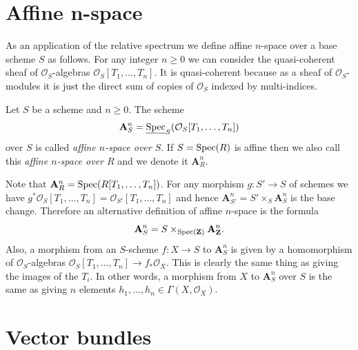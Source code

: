 \section{Affine n-space}
\label{section-affine-n-space}

\noindent
As an application of the relative spectrum
we define affine $n$-space over a base scheme
$S$ as follows. For any integer $n \geq 0$ we can consider the
quasi-coherent sheaf of $\mathcal{O}_S$-algebras
$\mathcal{O}_S[T_1, \ldots, T_n]$. It is quasi-coherent because
as a sheaf of $\mathcal{O}_S$-modules it is just the direct sum
of copies of $\mathcal{O}_S$ indexed by multi-indices.

\begin{definition}
\label{definition-affine-n-space}
\begin{reference}
\cite[Chapter II, \S 1, no. 31, p. 224]{FAC}
\end{reference}
Let $S$ be a scheme and $n \geq 0$.
The scheme
$$
\mathbf{A}^n_S =
\underline{\mathop{\mathrm{Spec}}}_S(\mathcal{O}_S[T_1, \ldots, T_n])
$$
over $S$ is called {\it affine $n$-space over $S$}.
If $S = \mathop{\mathrm{Spec}}(R)$ is affine then we also call this
{\it affine $n$-space over $R$} and we denote it $\mathbf{A}^n_R$.
\end{definition}

\noindent
Note that $\mathbf{A}^n_R = \mathop{\mathrm{Spec}}(R[T_1, \ldots, T_n])$.
For any morphism $g : S' \to S$ of schemes we have
$g^*\mathcal{O}_S[T_1, \ldots, T_n] = \mathcal{O}_{S'}[T_1, \ldots, T_n]$
and hence $\mathbf{A}^n_{S'} = S' \times_S \mathbf{A}^n_S$ is the base
change. Therefore an alternative definition of affine $n$-space
is the formula
$$
\mathbf{A}^n_S = S \times_{\mathop{\mathrm{Spec}}(\mathbf{Z})} \mathbf{A}^n_{\mathbf{Z}}.
$$
Also, a morphism from an $S$-scheme $f : X \to S$
to $\mathbf{A}^n_S$ is given by a homomorphism of
$\mathcal{O}_S$-algebras
$\mathcal{O}_S[T_1, \ldots, T_n] \to f_*\mathcal{O}_X$.
This is clearly the same thing as giving the images of the $T_i$.
In other words, a morphism from $X$ to $\mathbf{A}^n_S$ over $S$
is the same as giving $n$ elements
$h_1, \ldots, h_n \in \Gamma(X, \mathcal{O}_X)$.

















\section{Vector bundles}
\label{section-vector-bundle}


